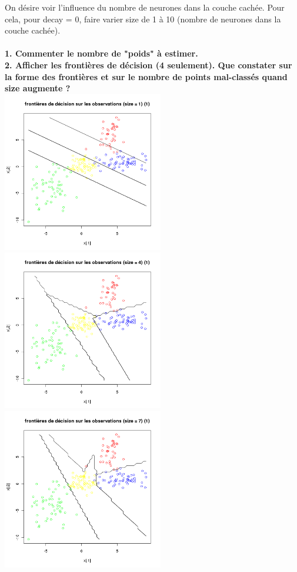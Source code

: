 \documentclass[a4paper, 10pt]{article}
\begin{document}
On désire voir l'influence du nombre de neurones dans la couche cachée. Pour cela, pour decay = 0, faire varier size de 1 à 10 (nombre de neurones dans la couche cachée).\\ \\
\textbf{1. Commenter le nombre de "poids" à estimer.}\\
\textbf{2. Afficher les frontières de décision (4 seulement). Que constater sur la forme des frontières et sur le nombre de points mal-classés quand size augmente ?}\\
\includegraphics[height = 7cm, width = 7cm]{plots/frontiere_bayes_q3_2_1.png}
\includegraphics[height = 7cm, width = 7cm]{plots/frontiere_bayes_q3_2_4.png}\\
\includegraphics[height = 7cm, width = 7cm]{plots/frontiere_bayes_q3_2_7.png}
\end{document}
